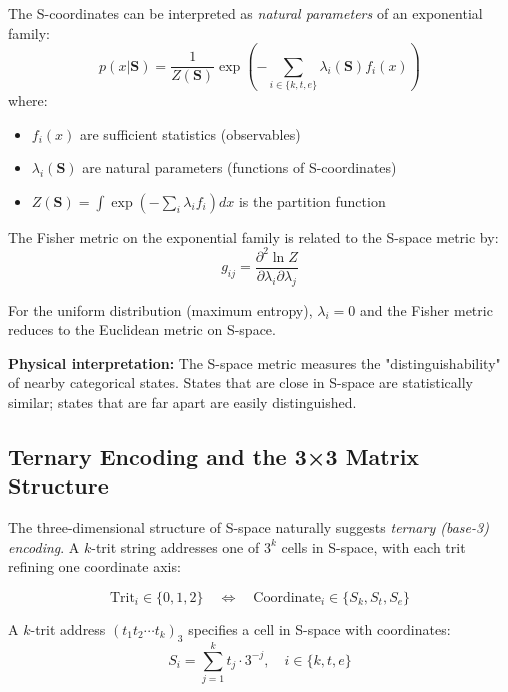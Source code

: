 \documentclass[twocolumn,10pt]{article}
\theoremstyle{remark}
\begin{document}
The S-coordinates can be interpreted as \textit{natural parameters} of an exponential family:
\begin{equation}
    p(x|\mathbf{S}) = \frac{1}{Z(\mathbf{S})} \exp\left(-\sum_{i \in \{k,t,e\}} \lambda_i(\mathbf{S}) f_i(x)\right)
    \label{eq:exponential_family}
\end{equation}
where:
\begin{itemize}
    \item $f_i(x)$ are sufficient statistics (observables)
    \item $\lambda_i(\mathbf{S})$ are natural parameters (functions of S-coordinates)
    \item $Z(\mathbf{S}) = \int \exp(-\sum_i \lambda_i f_i) dx$ is the partition function
\end{itemize}

The Fisher metric on the exponential family is related to the S-space metric by:
\begin{equation}
    g_{ij} = \frac{\partial^2 \ln Z}{\partial \lambda_i \partial \lambda_j}
    \label{eq:fisher_from_partition}
\end{equation}

For the uniform distribution (maximum entropy), $\lambda_i = 0$ and the Fisher metric reduces to the Euclidean metric on S-space.

\textbf{Physical interpretation:} The S-space metric measures the "distinguishability" of nearby categorical states. States that are close in S-space are statistically similar; states that are far apart are easily distinguished.

\subsection{Ternary Encoding and the 3×3 Matrix Structure}

The three-dimensional structure of S-space naturally suggests \textit{ternary (base-3) encoding}. A $k$-trit string addresses one of $3^k$ cells in S-space, with each trit refining one coordinate axis:

\begin{equation}
    \text{Trit}_i \in \{0, 1, 2\} \quad \Leftrightarrow \quad \text{Coordinate}_i \in \{S_k, S_t, S_e\}
    \label{eq:ternary_encoding}
\end{equation}

A $k$-trit address $(t_1 t_2 \cdots t_k)_3$ specifies a cell in S-space with coordinates:
\begin{equation}
    S_i = \sum_{j=1}^{k} t_j \cdot 3^{-j}, \quad i \in \{k, t, e\}
    \label{eq:ternary_address}
\end{equation}
\end{document}
